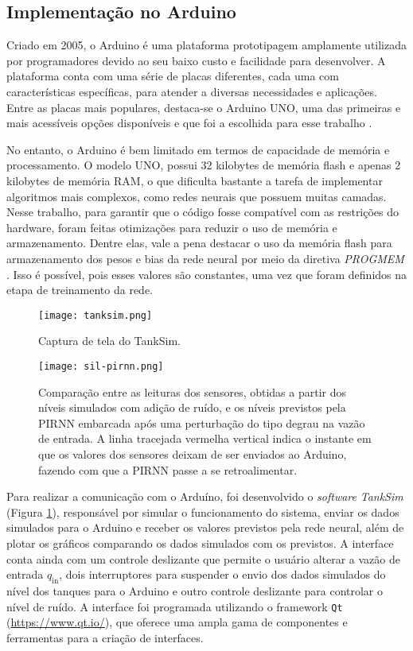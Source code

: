 \subsection{Implementação no Arduino}

Criado em 2005, o Arduino é uma plataforma prototipagem amplamente utilizada por programadores devido ao seu baixo custo e facilidade para desenvolver. A plataforma conta com uma série de placas diferentes, cada uma com características específicas, para atender a diversas necessidades e aplicações. Entre as placas mais populares, destaca-se o Arduino UNO, uma das primeiras e mais acessíveis opções disponíveis e que foi a escolhida para esse trabalho \citep{hughes_2016}.

No entanto, o Arduino é bem limitado em termos de capacidade de memória e processamento. O modelo UNO, possui 32 kilobytes de memória flash e apenas 2 kilobytes de memória RAM, o que dificulta bastante a tarefa de implementar algoritmos mais complexos, como redes neurais que possuem muitas camadas. Nesse trabalho, para garantir que o código fosse compatível com as restrições do hardware, foram feitas otimizações para reduzir o uso de memória e armazenamento. Dentre elas, vale a pena destacar o uso da memória flash para armazenamento dos pesos e bias da rede neural por meio da diretiva \textit{PROGMEM} \citep{margolis_2020}. Isso é possível, pois esses valores são constantes, uma vez que foram definidos na etapa de treinamento da rede.

\begin{figure}[ht]
  \centering
  \texttt{[image: tanksim.png]}
  \caption{Captura de tela do TankSim.}
  \label{fig:interface}
\end{figure}

\begin{figure*}[ht]
  \centering
  \texttt{[image: sil-pirnn.png]}
  \caption{Comparação entre as leituras dos sensores, obtidas a partir dos níveis simulados com adição de ruído, e os níveis previstos pela PIRNN embarcada após uma perturbação do tipo degrau na vazão de entrada. A linha tracejada vermelha vertical indica o instante em que os valores dos sensores deixam de ser enviados ao Arduino, fazendo com que a PIRNN passe a se retroalimentar.}
  \label{fig:sil-pirnn}
\end{figure*}

Para realizar a comunicação com o Arduíno, foi desenvolvido o \textit{software} \textit{TankSim} (Figura \ref{fig:interface}), responsável por simular o funcionamento do sistema, enviar os dados simulados para o Arduino e receber os valores previstos pela rede neural, além de plotar os gráficos comparando os dados simulados com os previstos. A interface conta ainda com um controle deslizante que permite o usuário alterar a vazão de entrada $q_{\mathrm{in}}$, dois interruptores para suspender o envio dos dados simulados do nível dos tanques para o Arduino e outro controle deslizante para controlar o nível de ruído. A interface foi programada utilizando o framework \texttt{Qt} (\url{https://www.qt.io/}), que oferece uma ampla gama de componentes e ferramentas para a criação de interfaces.

